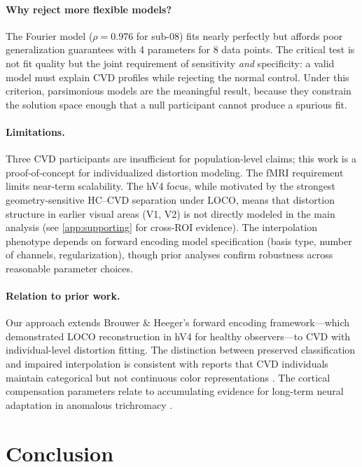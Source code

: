 \documentclass{article}
\begin{document}
\paragraph{Why reject more flexible models?}
The Fourier model ($\rho = 0.976$ for sub-08) fits nearly perfectly but affords poor generalization guarantees with 4 parameters for 8 data points.
The critical test is not fit quality but the joint requirement of sensitivity \emph{and} specificity: a valid model must explain CVD profiles while rejecting the normal control.
Under this criterion, parsimonious models are the meaningful result, because they constrain the solution space enough that a null participant cannot produce a spurious fit.

\paragraph{Limitations.}
Three CVD participants are insufficient for population-level claims; this work is a proof-of-concept for individualized distortion modeling.
The fMRI requirement limits near-term scalability.
The hV4 focus, while motivated by the strongest geometry-sensitive HC–CVD separation under LOCO, means that distortion structure in earlier visual areas (V1, V2) is not directly modeled in the main analysis (see \cref{app:supporting} for cross-ROI evidence).
The interpolation phenotype depends on forward encoding model specification (basis type, number of channels, regularization), though prior analyses confirm robustness across reasonable parameter choices.

\paragraph{Relation to prior work.}
Our approach extends Brouwer \& Heeger's \cite{placeholder_brouwer2009} forward encoding framework---which demonstrated LOCO reconstruction in hV4 for healthy observers---to CVD with individual-level distortion fitting.
The distinction between preserved classification and impaired interpolation is consistent with reports that CVD individuals maintain categorical but not continuous color representations \cite{placeholder_bannert2018}.
The cortical compensation parameters relate to accumulating evidence for long-term neural adaptation in anomalous trichromacy \cite{placeholder_tregillus2021, placeholder_emery2021}.

\section{Conclusion}
\label{sec:conclusion}
\end{document}
